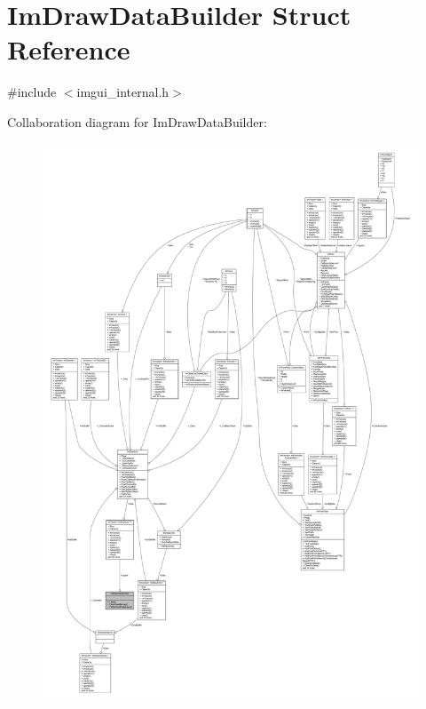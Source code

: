 \hypertarget{struct_im_draw_data_builder}{}\section{Im\+Draw\+Data\+Builder Struct Reference}
\label{struct_im_draw_data_builder}


{\ttfamily \#include $<$imgui\+\_\+internal.\+h$>$}



Collaboration diagram for Im\+Draw\+Data\+Builder\+:
\nopagebreak
\begin{figure}[H]
\begin{center}
\leavevmode
\includegraphics[width=350pt]{struct_im_draw_data_builder__coll__graph}
\end{center}
\end{figure}
